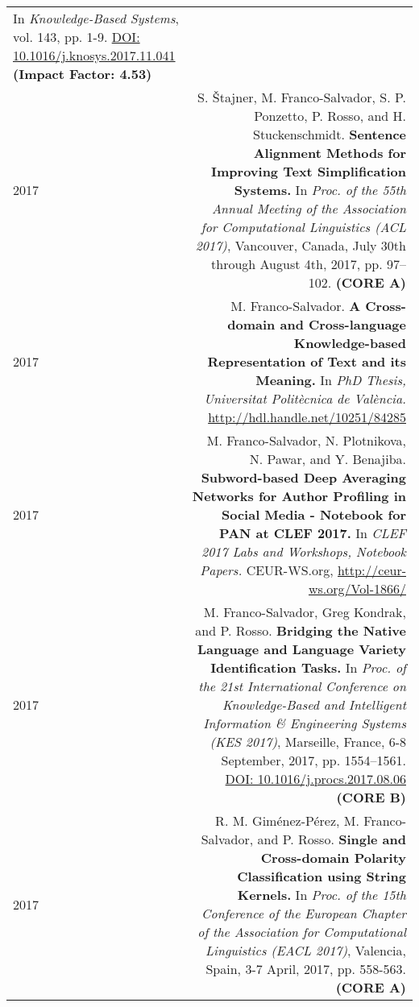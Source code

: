 \documentclass[10pt]{article}
\begin{document}
\begin{tabular}{L!{\VRule}R}
	In \emph{Knowledge-Based Systems}, vol. 143, pp. 1-9. \href{https://doi.org/10.1016/j.knosys.2017.11.041}{DOI: 10.1016/j.knosys.2017.11.041} \textbf{(Impact Factor: 4.53)} \vspace{5pt}\\	
	2017& S. \v{S}tajner, M. Franco-Salvador, S. P. Ponzetto, P. Rosso, and H. Stuckenschmidt. \textbf{Sentence Alignment Methods for Improving Text Simplification Systems.}
	In \emph{Proc. of the 55th Annual Meeting of the Association for Computational Linguistics (ACL 2017)},  Vancouver, Canada, July 30th through August 4th, 2017, pp. 97--102. \textbf{(CORE A)}\vspace{5pt}\\
	2017& M. Franco-Salvador. \textbf{A Cross-domain and Cross-language Knowledge-based Representation of Text and its Meaning.}
	In \emph{PhD Thesis, Universitat Polit{\`e}cnica de Val{\`e}ncia.} \href{http://hdl.handle.net/10251/84285}{http://hdl.handle.net/10251/84285}\vspace{5pt}\\
	2017& M. Franco-Salvador, N. Plotnikova, N. Pawar, and Y. Benajiba. \textbf{Subword-based Deep Averaging Networks for Author Profiling in Social Media - Notebook for PAN at CLEF 2017.}
	In \emph{CLEF 2017 Labs and Workshops, Notebook Papers.} CEUR-WS.org, \href{http://ceur-ws.org/Vol-1866/}{http://ceur-ws.org/Vol-1866/} \vspace{5pt}\\
    2017&M. Franco-Salvador, Greg Kondrak, and P. Rosso. \textbf{Bridging the Native Language and Language Variety Identification Tasks.}
	In \emph{Proc. of the 21st International Conference on Knowledge-Based and Intelligent Information \& Engineering Systems (KES 2017)}, Marseille, France, 6-8 September, 2017, pp. 1554--1561. \href{https://doi.org/10.1016/j.procs.2017.08.068}{DOI: 10.1016/j.procs.2017.08.06} \textbf{(CORE B)}\vspace{5pt}\\
	2017&R. M. Gim{\'e}nez-P{\'e}rez, M. Franco-Salvador, and P. Rosso. \textbf{Single and Cross-domain Polarity Classification using String Kernels.}
	In \emph{Proc. of the 15th Conference of the European Chapter of the Association for Computational Linguistics (EACL 2017)}, Valencia, Spain, 3-7 April, 2017, pp. 558-563. \textbf{(CORE A)}\vspace{5pt}\\	
\end{tabular}
\end{document}

